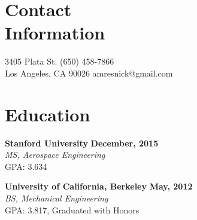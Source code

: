 \documentclass[margin,line]{resume}
\begin{document}
\begin{resume}

    \section{\mysidestyle Contact\\Information}

    3405 Plata St.						                       \hfill (650) 458-7866\\
    Los Angeles, CA 90026								\hfill amresnick@gmail.com

    \section{\mysidestyle Education}

    \textbf{Stanford University} \hfill \textbf{December, 2015} \\%
    \textsl{MS, Aerospace Engineering} \\%
    GPA: 3.634

    \textbf{University of California, Berkeley} \hfill \textbf{May, 2012}\\%
    \textsl{BS, Mechanical Engineering} \\%
    GPA: 3.817, Graduated with Honors




\end{resume}
\end{document}
